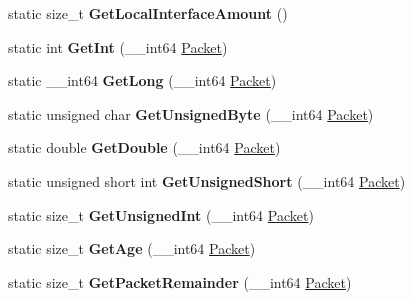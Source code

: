\begin{DoxyCompactItemize}
\item 
\hypertarget{structmn_c_l_r_a1cfade75bccb9be332242885fd76403c}{
static size\_\-t {\bfseries GetLocalInterfaceAmount} ()}
\label{structmn_c_l_r_a1cfade75bccb9be332242885fd76403c}

\item 
\hypertarget{structmn_c_l_r_a644e2e626a903bbfa75948528d6de530}{
static int {\bfseries GetInt} (\_\-\_\-int64 \hyperlink{class_packet}{Packet})}
\label{structmn_c_l_r_a644e2e626a903bbfa75948528d6de530}

\item 
\hypertarget{structmn_c_l_r_a05625365263db5b130a504c8af88a539}{
static \_\-\_\-int64 {\bfseries GetLong} (\_\-\_\-int64 \hyperlink{class_packet}{Packet})}
\label{structmn_c_l_r_a05625365263db5b130a504c8af88a539}

\item 
\hypertarget{structmn_c_l_r_a78db9a1dd94c9bfa848ff2fe16a958cf}{
static unsigned char {\bfseries GetUnsignedByte} (\_\-\_\-int64 \hyperlink{class_packet}{Packet})}
\label{structmn_c_l_r_a78db9a1dd94c9bfa848ff2fe16a958cf}

\item 
\hypertarget{structmn_c_l_r_acf487a56a80d6d3283bbb6a7f3e5b48b}{
static double {\bfseries GetDouble} (\_\-\_\-int64 \hyperlink{class_packet}{Packet})}
\label{structmn_c_l_r_acf487a56a80d6d3283bbb6a7f3e5b48b}

\item 
\hypertarget{structmn_c_l_r_ac12d90fe8e5b50b46199d19e8bdba206}{
static unsigned short int {\bfseries GetUnsignedShort} (\_\-\_\-int64 \hyperlink{class_packet}{Packet})}
\label{structmn_c_l_r_ac12d90fe8e5b50b46199d19e8bdba206}

\item 
\hypertarget{structmn_c_l_r_a2c54b94414a86918a3df475bf6aab10c}{
static size\_\-t {\bfseries GetUnsignedInt} (\_\-\_\-int64 \hyperlink{class_packet}{Packet})}
\label{structmn_c_l_r_a2c54b94414a86918a3df475bf6aab10c}

\item 
\hypertarget{structmn_c_l_r_a7baacd9cb1f1f5dc98587d2fa02f56ec}{
static size\_\-t {\bfseries GetAge} (\_\-\_\-int64 \hyperlink{class_packet}{Packet})}
\label{structmn_c_l_r_a7baacd9cb1f1f5dc98587d2fa02f56ec}

\item 
\hypertarget{structmn_c_l_r_a0b978a35238b7ca5e0412e7ac7ed7dd1}{
static size\_\-t {\bfseries GetPacketRemainder} (\_\-\_\-int64 \hyperlink{class_packet}{Packet})}
\label{structmn_c_l_r_a0b978a35238b7ca5e0412e7ac7ed7dd1}


\end{DoxyCompactItemize}
